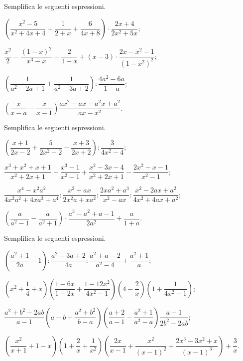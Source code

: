 \begin{esercizio}[\Ast]
\label{ese:14.42}
Semplifica le seguenti espressioni.
\begin{enumeratea}
 \item $\left(\dfrac{x^{2}-5}{x^{2}+4x+4}+\dfrac{1}{2+x}+\dfrac{6}{4x+8}\right)\cdot {\dfrac{2x+4}{2x^{2}+5x}}$;
 \item $\dfrac{x^{2}}{2}-\dfrac{(1-x)^{2}}{x^{3}-x}-\dfrac{2}{1-x}+(x-3)\cdot {\dfrac{2x-x^{2}-1}{(1-x^{2})^{2}}}$;
 \item $\left(\dfrac{1}{a^{2}-2a+1}+\dfrac{1}{a^{2}-3a+2}\right):\dfrac{4a^{2}-6a}{1-a}$;
 \item $\left(\dfrac{x}{x-a}-\dfrac{x}{x-1}\right)\dfrac{ax^{2}-ax-a^{2}x+a^{2}}{ax-x^{2}}$.
\end{enumeratea}
\end{esercizio}

\begin{esercizio}[\Ast]
\label{ese:14.43}
Semplifica le seguenti espressioni.
\begin{enumeratea}
 \item $\left(\dfrac{x+1}{2x-2}+\dfrac{5}{2x^{2}-2}-\dfrac{x+3}{2x+2}\right):\dfrac{3}{4x^{2}-4}$;
 \item $\dfrac{x^{3}+x^{2}+x+1}{x^{2}+2x+1}-\dfrac{x^{3}-1}{x^{2}-1}+\dfrac{x^{2}-3x-4}{x^{2}+2x+1}-\dfrac{2x^{2}-x-1}{x^{2}-1}$;
 \item $\dfrac{x^{4}-x^{2}a^{2}}{4x^{2}a^{2}+4xa^{3}+a^{4}}:\dfrac{x^{2}+ax}{2x^{2}a+xa^{2}}:\dfrac{2xa^{2}+a^{3}}{x^{2}-ax}:\dfrac{x^{2}-2ax+a^{2}}{4x^{2}+4ax+a^{2}}$;
 \item $\left(\dfrac{a}{a^{2}-1}-\dfrac{a}{a^{2}+1}\right)\cdot\dfrac{a^{3}-a^{2}+a-1}{2a^{2}}+\dfrac{a}{1+a}$.
\end{enumeratea}
\end{esercizio}

\begin{esercizio}[\Ast]
\label{ese:14.44}
Semplifica le seguenti espressioni.
\begin{enumeratea}
 \item $\left(\dfrac{a^{2}+1}{2a}-1\right):\dfrac{a^{2}-3a+2}{4a}:\dfrac{a^{2}+a-2}{a^{2}-4}+\dfrac{a^{2}+1}{a}$;
 \item $\left(x^{2}+\dfrac{1}{4}+x\right)\left(\dfrac{1-6x}{1-2x}+\dfrac{1-12x^{2}}{4x^{2}-1}\right)\left(4-\dfrac{2}{x}\right)\left(1+\dfrac{1}{4x^{2}-1}\right)$;
 \item $\dfrac{a^{2}+b^{2}-2ab}{a-1}\left(a-b+\dfrac{a^{2}+b^{2}}{b-a}\right)\left(\dfrac{a+2}{a-1}-\dfrac{a^{2}+1}{a^{2}-a}\right)\dfrac{a-1}{2b^{2}-2ab}$;
 \item $\left(\dfrac{x^{2}}{x+1}+1-x\right)\left(1+\dfrac{2}{x}+\dfrac{1}{x^{2}}\right)\left(\dfrac{2x}{x-1}+\dfrac{x^{2}}{(x-1)^{2}}+\dfrac{2x^{3}-3x^{2}+x}{(x-1)^{3}}\right)+\dfrac{3}{x}$.
\end{enumeratea}
\end{esercizio}

